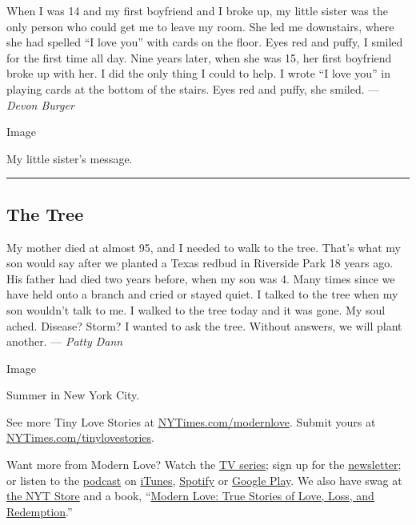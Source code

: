 When I was 14 and my first boyfriend and I broke up, my little sister
was the only person who could get me to leave my room. She led me
downstairs, where she had spelled ``I love you'' with cards on the
floor. Eyes red and puffy, I smiled for the first time all day. Nine
years later, when she was 15, her first boyfriend broke up with her. I
did the only thing I could to help. I wrote ``I love you'' in playing
cards at the bottom of the stairs. Eyes red and puffy, she smiled. ---
\emph{Devon Burger}

Image

My little sister's message.

\begin{center}\rule{0.5\linewidth}{\linethickness}\end{center}

\hypertarget{the-tree}{%
\subsection{The Tree}\label{the-tree}}

My mother died at almost 95, and I needed to walk to the tree. That's
what my son would say after we planted a Texas redbud in Riverside Park
18 years ago. His father had died two years before, when my son was 4.
Many times since we have held onto a branch and cried or stayed quiet. I
talked to the tree when my son wouldn't talk to me. I walked to the tree
today and it was gone. My soul ached. Disease? Storm? I wanted to ask
the tree. Without answers, we will plant another. --- \emph{Patty Dann}

Image

Summer in New York City.

See more Tiny Love Stories at
\href{https://www.nytimes3xbfgragh.onion/column/modern-love}{NYTimes.com/modernlove}.
Submit yours at
\href{http://nytimes3xbfgragh.onion/tinylovestories}{NYTimes.com/tinylovestories}.

Want more from Modern Love? Watch the
\href{https://www.nytimes3xbfgragh.onion/2019/09/12/style/modern-love-tv-show-trailer.html}{TV
series}; sign up for the
\href{https://www.nytimes3xbfgragh.onion/newsletters/love-letter}{newsletter};
or listen to the
\href{https://www.nytimes3xbfgragh.onion/column/modern-love-podcast}{podcast}
on
\href{https://itunes.apple.com/us/podcast/modern-love/id1065559535?mt=2\&version=meter+at+0\&module=meter-Links\&pgtype=article\&contentId=\&mediaId=\&referrer=\&priority=true\&action=click\&contentCollection=meter-links-click}{iTunes},
\href{https://open.spotify.com/show/03Er7mSPq9IEewOgbPD3vO}{Spotify} or
\href{https://play.google.com/music/listen?u=0\#/ps/Iktqjbkz7bychbnofblw32dik64}{Google
Play}. We also have swag at
\href{https://store.nytimes3xbfgragh.onion/collections/modern-love}{the
NYT Store} and a book,
``\href{https://www.penguinrandomhouse.com/books/623036/modern-love-revised-and-updated-by-edited-by-daniel-jones-with-contributions-by-andrew-rannells-ayelet-waldman-amy-krouse-rosenthal-veronica-chambers-and-more/}{Modern
Love: True Stories of Love, Loss, and Redemption}.''

